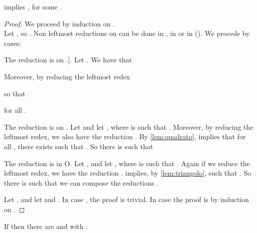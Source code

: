 \begin{lemma}[Inversion] \label{lem:inversion}
 implies , for some .
\end{lemma}
\begin{proof}
We proceed by induction on .\\
Let , so .
Non leftmost reductions on  can be done in , in  or in  (). We procede by cases:
\begin{enumcases}
\item The reduction is on .].
Let .
We have that

Moreover, by reducing the leftmost redex

so that

for all .

\item The reduction is on .
Let  and let , where  is such that
.
Moreover, by reducing the leftmost redex, we also have the reduction
.
By \autoref{lem:quadrato},  implies that for all ,
there exists  such that .
So there is  such that


\item The reduction is in O.
Let , and let
,
where  is such that .
Again if we reduce the leftmost redex, we have the reduction
.
 implies, by \autoref{lem:triangolo},  such that
. So there is  such that we
can compose the reductions
.
\end{enumcases}

Let , and let  and .
In case , the proof is trivial. In case  the proof is by induction on .\qedhere

\end{proof}
\begin{corollary}\label{cor:reordering}
  If  then there are 
  and  with .
\end{corollary}


